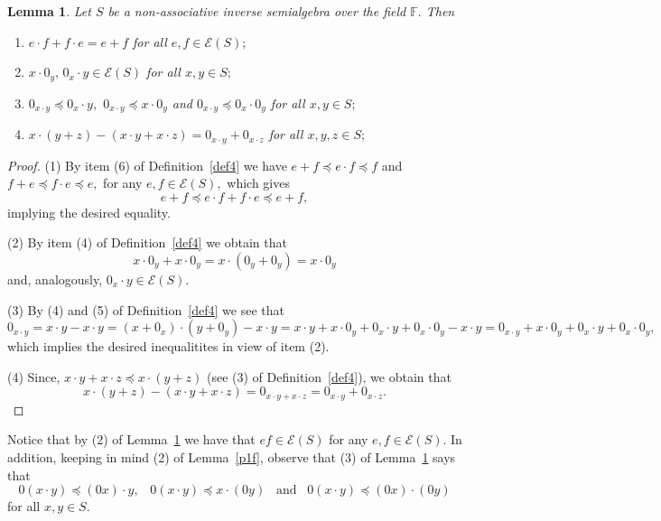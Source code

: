 \documentclass[10pt,a4paper]{amsart}
\newtheorem{lem}[thm]{Lemma}
\theoremstyle{definition}
\theoremstyle{remark}
\numberwithin{equation}{section}
\newtheorem*{Theorem A}{\textbf{Theorem A}}
\newtheorem*{Corollary E}{\textbf{Corollary E}}
\newtheorem*{Corollary F}{\textbf{Corollary F}}
\newtheorem*{Theorem B}{\textbf{Theorem B}}
\newtheorem*{Theorem C}{\textbf{Theorem C}}
\newtheorem*{Theorem D}{\textbf{Theorem B}}
\newtheorem*{p a}{\textbf{Proof of  Theorem A}}
\newtheorem*{p b}{\textbf{Proof of Theorem B}}
\newtheorem*{p c}{\textbf{Proof of  Theorem C}}
\newtheorem*{p d}{\textbf{Proof of  Theorem D}}
\newcommand{\E}{\mathcal{E}}
\newcommand{\0}{{\vartheta}}
\begin{document}
\begin{lem}\label{lemma_basicproperties}
Let $S$ be a  non-associative inverse semialgebra   over the field $\mathbb{F}.$ Then


\begin{enumerate}
\item $e \cdot f + f\cdot e = e+f$ for all $e,f \in \E (S);$
\item $x\cdot 0_y, \, 0_x \cdot y \in \E(S)$ for all $x,y\in S;$
     \item 	$0_{x\cdot y}\preceq 0_x\cdot y,$ 
     $0_{x\cdot y}\preceq x \cdot 0_y$ and $0_{x\cdot y}\preceq 0_x \cdot 0_y$ for all $x,y\in S;$ 
    \item $x \cdot (y+z)-(x\cdot y+x\cdot z) = 0_{x\cdot y}+0_{x\cdot z}$ for all $x,y,z\in S;$
\end{enumerate} 
\end{lem}
\begin{proof}
(1)  By item (6) of Definition~\ref{def4}  we have  $e+f \preceq  e\cdot f \preceq  f $ and  $f+e \preceq  f\cdot e \preceq  e ,$ for any $e,f \in \E (S),$ which gives  $$e+f \preceq  e\cdot f + f \cdot e \preceq  e+ f,  $$ implying the desired equality.

(2)  By item (4) of Definition~\ref{def4}   we obtain that
$$ x\cdot 0_y + x\cdot 0_y = x\cdot (0_y +  0_y)
=  x\cdot 0_y $$ and, analogously, $ 0_x \cdot y \in \E(S).$ 

(3) By (4) and  (5)  of Definition~\ref{def4} we see that 
$$0_{x\cdot y}=x\cdot y-x\cdot y=(x+0_x)\cdot (y+0_y)-x\cdot y=x\cdot y + x\cdot 0_y + 0_{x}\cdot y+0_{x}\cdot 0_y -x\cdot y = 0_{x\cdot y} + x\cdot 0_y + 0_{x}\cdot y+0_{x}\cdot 0_y,$$ which implies the desired inequalitites in view of item (2).
 
(4) Since,  $x\cdot y+x\cdot z\preceq x\cdot (y+z)$ (see (3) of Definition~\ref{def4}),  we obtain that
$$x\cdot (y+z)-(x\cdot y+x\cdot z)=0_{x\cdot y+x\cdot z}=0_{x\cdot y}+0_{x\cdot z}.$$
\end{proof}

Notice that by (2) of 
 Lemma~\ref{lemma_basicproperties}  we have that $ef \in \E(S)$  for any $e,f \in \E (S).$ In addition, keeping in mind (2) of Lemma~\ref{p1f}, observe that  
 (3) of  Lemma~\ref{lemma_basicproperties} says  that 
     $$0 (x\cdot y) \preceq (0x)\cdot y, \;\;\; 0(x\cdot y)\preceq x \cdot (0y)  \;\;\; \text{and} \;\;\; 
     0(x\cdot y)\preceq (0x) \cdot (0y)$$ for all $x,y\in S.$ 
		
\end{document}
